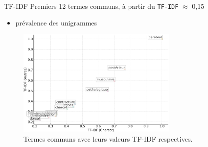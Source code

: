 	\begin{frame}{\textsc{TF-IDF}}
		Premiers 12 termes communs, à partir du \texttt{TF-IDF} $\approx$ \textsc{0,15}
		\begin{itemize}
			\item prévalence des unigrammes
		\end{itemize}
				\begin{figure}[!h]
			\centering
			\includegraphics[width=0.7\textwidth]{pic/scatter_plot.png}
			\caption{Termes communs avec leurs valeurs \textsc{TF-IDF} respectives.}
		\end{figure}
	\end{frame}

%	
%	
%	


